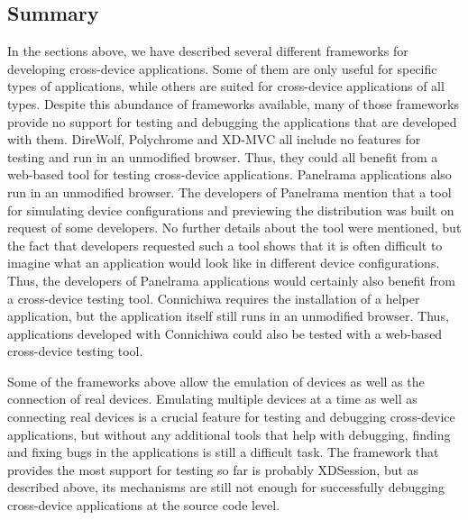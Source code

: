 \subsection{Summary}

In the sections above, we have described several different frameworks for developing cross-device applications. Some of them are only useful for specific types of applications, while others are suited for cross-device applications of all types. Despite this abundance of frameworks available, many of those frameworks provide no support for testing and debugging the applications that are developed with them. DireWolf, Polychrome and XD-MVC all include no features for testing and run in an unmodified browser. Thus, they could all benefit from a web-based tool for testing cross-device applications. Panelrama applications also run in an unmodified browser. The developers of Panelrama mention that a tool for simulating device configurations and previewing the distribution was built on request of some developers. No further details about the tool were mentioned, but the fact that developers requested such a tool shows that it is often difficult to imagine what an application would look like in different device configurations. Thus, the developers of Panelrama applications would certainly also benefit from a cross-device testing tool. Connichiwa requires the installation of a helper application, but the application itself still runs in an unmodified browser. Thus, applications developed with Connichiwa could also be tested with a web-based cross-device testing tool.

Some of the frameworks above allow the emulation of devices as well as the connection of real devices. Emulating multiple devices at a time as well as connecting real devices is a crucial feature for testing and debugging cross-device applications, but without any additional tools that help with debugging, finding and fixing bugs in the applications is still a difficult task. The framework that provides the most support for testing so far is probably XDSession, but as described above, its mechanisms are still not enough for successfully debugging cross-device applications at the source code level.